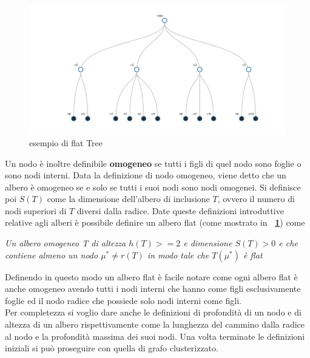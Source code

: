 {\begin{figure}[!htb]
	\begin{center}
		\includegraphics[width=0.8 \linewidth]{figure/flatTree}
	\end{center}
	\caption{esempio di flat Tree \label{fig:flatTree}}
\end{figure}
Un nodo è inoltre definibile \textbf{omogeneo} se tutti i figli di quel nodo sono foglie o sono nodi interni.
Data la definizione di nodo omogeneo, viene detto che un albero è omogeneo se e solo se tutti i suoi nodi sono nodi omogenei.
Si definisce poi $S(T)$ come la dimensione dell'albero di inclusione $T$, ovvero il numero di nodi superiori di $T$ diversi dalla radice.
Date queste definizioni introduttive relative agli alberi è possibile definire un albero flat (come mostrato in \textbf{\figurename~\ref{fig:flatTree}}) come \\
\begin{center}
	\textit{Un albero omogeneo T di altezza $h(T)>= 2$ e dimensione $S(T)> 0$  e che contiene almeno un nodo $\mu^*\neq r(T)$ in modo tale che $T(\mu^*)$ è flat}
\end{center}
Definendo in questo modo un albero flat è facile notare come ogni albero flat è anche omogeneo avendo tutti i nodi interni che hanno come figli esclusivamente foglie ed il nodo radice che possiede solo nodi interni come figli.\\
Per completezza si voglio dare anche le definizioni di profondità di un nodo e di altezza di un albero rispettivamente come la lunghezza del cammino dalla radice al nodo e la profondità massima dei suoi nodi.
Una volta terminate le definizioni iniziali si può proseguire con quella di grafo clusterizzato.
}
